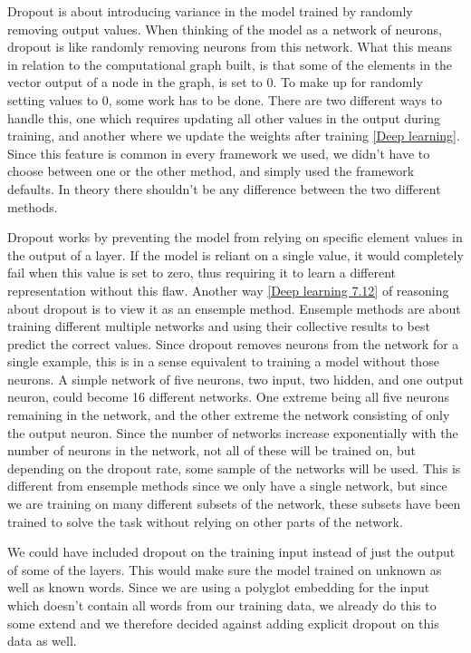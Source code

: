 Dropout is about introducing variance in the model trained by randomly removing
output values. When thinking of the model as a network of neurons, dropout is
like randomly removing neurons from this network. What this means in relation to
the computational graph built, is that some of the elements in the vector output
of a node in the graph, is set to 0. To make up for randomly setting values to
0, some work has to be done. There are two different ways to handle this, one
which requires updating all other values in the output during training, and
another where we update the weights after training \ref{Deep learning}. Since
this feature is common in every framework we used, we didn't have to choose
between one or the other method, and simply used the framework defaults. In
theory there shouldn't be any difference between the two different methods.

Dropout works by preventing the model from relying on specific element values in
the output of a layer. If the model is reliant on a single value, it would
completely fail when this value is set to zero, thus requiring it to learn a
different representation without this flaw. Another way \ref{Deep learning 7.12}
of reasoning about dropout is to view it as an ensemple method. Ensemple methods
are about training different multiple networks and using their collective
results to best predict the correct values. Since dropout removes neurons from
the network for a single example, this is in a sense equivalent to training a
model without those neurons. A simple network of five neurons, two input, two
hidden, and one output neuron, could become 16 different networks. One extreme
being all five neurons remaining in the network, and the other extreme the
network consisting of only the output neuron. Since the number of networks
increase exponentially with the number of neurons in the network, not all of
these will be trained on, but depending on the dropout rate, some sample of the
networks will be used. This is different from ensemple methods since we only
have a single network, but since we are training on many different subsets of
the network, these subsets have been trained to solve the task without relying
on other parts of the network. 

We could have included dropout on the training input instead of just the output
of some of the layers. This would make sure the model trained on unknown as well
as known words. Since we are using a polyglot embedding for the input which
doesn't contain all words from our training data, we already do this to some
extend and we therefore decided against adding explicit dropout on this data as
well.


